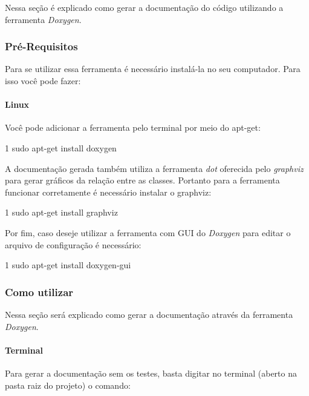 Nessa seção é explicado como gerar a documentação do código utilizando a ferramenta {\itshape Doxygen}.

\subsubsection*{Pré-\/\+Requisitos}

Para se utilizar essa ferramenta é necessário instalá-\/la no seu computador. Para isso você pode fazer\+:

\paragraph*{Linux}

Você pode adicionar a ferramenta pelo terminal por meio do apt-\/get\+:


\begin{DoxyCode}
1 sudo apt-get install doxygen 
\end{DoxyCode}


A documentação gerada também utiliza a ferramenta {\itshape dot} oferecida pelo {\itshape graphviz} para gerar gráficos da relação entre as classes. Portanto para a ferramenta funcionar corretamente é necessário instalar o graphviz\+:


\begin{DoxyCode}
1 sudo apt-get install graphviz
\end{DoxyCode}


Por fim, caso deseje utilizar a ferramenta com G\+UI do {\itshape Doxygen} para editar o arquivo de configuração é necessário\+:


\begin{DoxyCode}
1 sudo apt-get install doxygen-gui
\end{DoxyCode}


\subsubsection*{Como utilizar}

Nessa seção será explicado como gerar a documentação através da ferramenta {\itshape Doxygen}.

\paragraph*{Terminal}

Para gerar a documentação sem os testes, basta digitar no terminal (aberto na pasta raiz do projeto) o comando\+:


